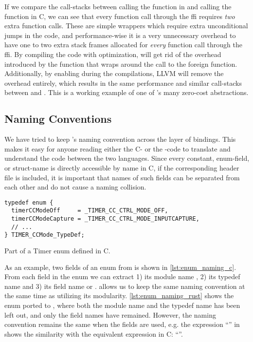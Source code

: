 If we compare the call-stacks between calling the  function in {\rust} and calling the  function in C, we can see that every function call through the \gls{ffi} requires \emph{two} extra function calls.
These are simple wrappers which require extra unconditional jumps in the code, and performance-wise it is a very unnecessary overhead to have one to two extra stack frames allocated for \emph{every} function call through the \gls{ffi}.
By compiling the code with optimization, {\rust} will get rid of the overhead introduced by the function that wraps around the call to the foreign function.
Additionally, by enabling  during the compilations, LLVM will remove the overhead entirely, which results in the same performance and similar call-stacks between \C and {\rust}.
This is a working example of one of {\rust}'s many zero-cost abstractions.

\subsection{Naming Conventions}

We have tried to keep \emlib's naming convention across the layer of bindings.
This makes it easy for anyone reading either the C- or the {\rust}-code to translate and understand the code between the two languages.
Since every constant, enum-field, or struct-name is directly accessible by name in C, if the corresponding header file is included, it is important that names of such fields can be separated from each other and do not cause a naming collision.

\begin{listing}[h]
\begin{verbatim}
typedef enum {
  timerCCModeOff     = _TIMER_CC_CTRL_MODE_OFF,
  timerCCModeCapture = _TIMER_CC_CTRL_MODE_INPUTCAPTURE,
  // ...
} TIMER_CCMode_TypeDef;
\end{verbatim}
\caption{Part of a Timer enum defined in C.}
\label{lst:enum_naming_c}
\end{listing}

As an example, two fields of an enum from  is shown in \autoref{lst:enum_naming_c}.
From each field in the enum we can extract 1) its module name , 2) its typedef name  and 3) its field name  or .
\rust allows us to keep the same naming convention at the same time as utilizing its modularity.
\autoref{lst:enum_naming_rust} shows the enum ported to {\rust}, where both the module name and the typedef name has been left out, and only the field names have remained.
However, the naming convention remains the same when the fields are used, e.g. the expression ``'' in {\rust} shows the similarity with the equivalent expression in C: ``''.

